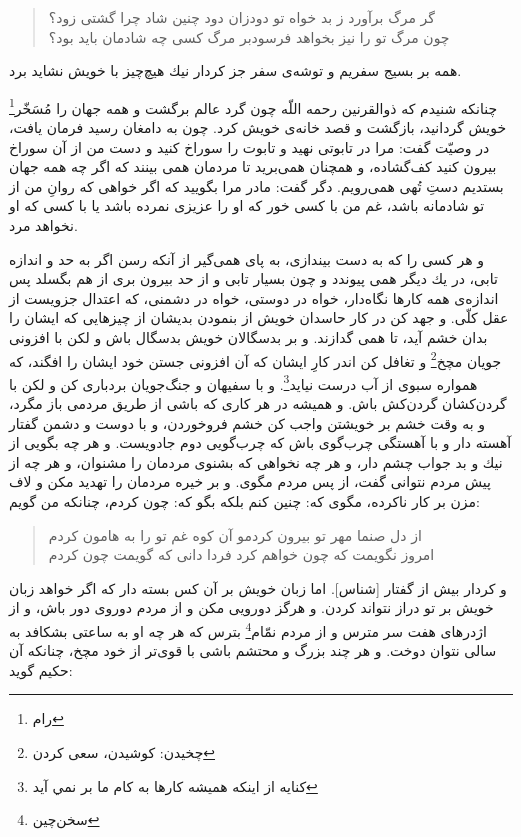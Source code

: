 \begin{quote}
گر مرگ برآورد ز بد خواه تو دود\quad \quad زان دود چنين شاد چرا گشتى زود؟ \\
چون مرگ تو را نيز بخواهد فرسود\quad \quad بر مرگ كسى چه شادمان بايد بود؟
\end{quote}
همه بر بسيج سفريم و توشه‌ی سفر جز كردار نيك هيچ‌چيز با خويش نشايد برد.

چنانكه شنيدم كه ذوالقرنين رحمه اللّه چون گرد عالم برگشت و همه جهان را مُسَخّر\footnote{رام} خويش گردانيد، بازگشت و قصد خانه‌ی خويش كرد. چون به دامغان رسيد فرمان يافت، در وصيّت گفت: مرا در تابوتى نهيد و تابوت را سوراخ كنيد و دست من از آن سوراخ بيرون كنيد كف‌گشاده، و همچنان همى‌بريد تا مردمان همى بينند كه اگر چه همه جهان بستديم دستِ تُهى همى‌رويم. دگر گفت: مادر مرا بگوييد كه اگر خواهى كه روانِ من از تو شادمانه باشد، غم من با كسى خور كه او را عزيزى نمرده باشد يا با كسى كه او نخواهد مرد.

و هر كسى را كه به دست بيندازى، به پاى همى‌گير از آنكه رسن اگر به حد و اندازه تابى، در يك ديگر همى پيوندد و چون بسيار تابى و از حد بيرون برى از هم بگسلد پس اندازه‌ی همه كارها نگاه‌دار، خواه در دوستى، خواه در دشمنى، كه اعتدال جزويست از عقل كلّى. و جهد كن در كار حاسدان خويش از بنمودن بديشان از چيزهايى كه ايشان را بدان خشم آيد، تا همى گدازند. و بر بدسگالان خويش بدسگال باش و لكن با افزونى جويان مچخ\footnote{چخیدن: کوشیدن، سعی کردن} و تغافل كن اندر كارِ ايشان كه آن افزونى جستن خود ايشان را افگند، كه همواره سبوى از آب درست نيايد\footnote{کنایه از اینکه هميشه كارها به كام ما بر نمي آيد}. و با سفيهان و جنگ‌جويان بردبارى كن و لكن با گردن‌كشان گردن‌كش باش. و هميشه در هر كارى كه باشى از طريق مردمى باز مگرد، و به وقت خشم بر خويشتن واجب كن خشم فروخوردن، و با دوست و دشمن گفتار آهسته دار و با آهستگى چرب‌گوى باش كه چرب‌گويى دوم جادويست. و هر چه بگويى از نيك و بد جواب چشم‌ دار، و هر چه نخواهى كه بشنوى مردمان را مشنوان، و هر چه از پيش مردم نتوانى گفت، از پس مردم مگوى. و بر خيره مردمان را تهديد مكن و لاف مزن بر كار ناكرده، مگوى كه: چنين كنم بلكه بگو كه: چون كردم، چنانكه من گويم:

\begin{quote}
از دل صنما مهر تو بيرون كردم\quad \quad و آن كوه غم تو را به هامون كردم \\
امروز نگويمت كه چون خواهم كرد \quad \quad فردا دانى كه گويمت چون كردم
\end{quote}
و كردار بيش از گفتار [شناس]. اما زبان خويش بر آن كس بسته دار كه اگر خواهد زبان خويش بر تو دراز نتواند كردن. و هرگز دورويى مكن و از مردم دوروى دور باش، و از اژدرهاى هفت سر مترس و از مردم نمّام\footnote{سخن‌چین} بترس كه هر چه او به ساعتى بشكافد به سالى نتوان دوخت. و هر چند بزرگ و محتشم باشى با قوى‌تر از خود مچخ، چنانكه آن حكيم گويد:

